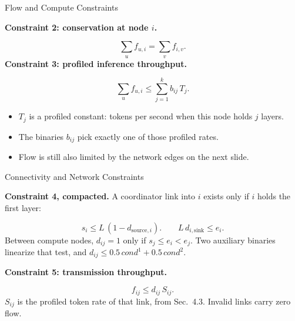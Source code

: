 \begin{frame}[t,label=mm_hx_milp_03]{Flow and Compute Constraints}

  \par
  \vspace{.12cm}
  {\footnotesize\textbf{Constraint 2: conservation at node \(i\).}}\par
  \[
    \sum_u f_{u,i}=\sum_v f_{i,v}.
  \]
  {\footnotesize\textbf{Constraint 3: profiled inference throughput.}}\par
  \[
    \sum_u f_{u,i}\le \sum_{j=1}^{k} b_{ij}\,T_j.
  \]
  \begin{itemize}\footnotesize
    \setlength{\itemsep}{.04cm}
    \item \(T_j\) is a profiled constant: tokens per second when this node holds \(j\) layers.
    \item The binaries \(b_{ij}\) pick exactly one of those profiled rates.
    \item Flow is still also limited by the network edges on the next slide.
  \end{itemize}
  \vspace{.02cm}
\end{frame}

\begin{frame}[t,label=mm_hx_netcon_01]{Connectivity and Network Constraints}

  \par
  \vspace{.06cm}
  {\footnotesize\textbf{Constraint 4, compacted.} A coordinator link into \(i\) exists only if \(i\) holds the first layer:}\par
  \[
    s_i\le L\,(1-d_{\mathrm{source},i}).
    \qquad
    L\,d_{i,\mathrm{sink}}\le e_i.
  \]
  {\footnotesize Between compute nodes, \(d_{ij}=1\) only if \(s_j\le e_i<e_j\). Two auxiliary binaries linearize that test, and \(d_{ij}\le 0.5\,\mathit{cond}^{1}+0.5\,\mathit{cond}^{2}\).}\par
  \vspace{.06cm}
  {\footnotesize\textbf{Constraint 5: transmission throughput.}}\par
  \[
    f_{ij}\le d_{ij}\,S_{ij}.
  \]
  {\footnotesize \(S_{ij}\) is the profiled token rate of that link, from Sec.~4.3. Invalid links carry zero flow.}\par
  \vspace{.10cm}
\end{frame}

